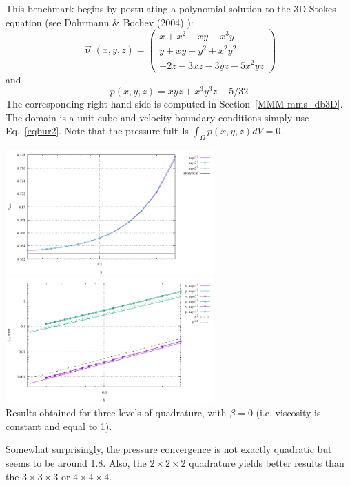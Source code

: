 This benchmark begins by postulating a polynomial solution 
to the 3D Stokes equation (see Dohrmann \& Bochev (2004) \cite{dobo04}):
\begin{equation}
\vec{\upnu}(x,y,z)
=
\left(
\begin{array}{c}
x+x^2+xy+x^3y \\
y + xy + y^2 + x^2 y^2\\
-2z - 3xz - 3yz - 5x^2 yz
\end{array}
\right)
\label{eqbur2}
\end{equation}
and
\begin{equation}
p(x,y,z) = xyz + x^3 y^3z - 5/32
\end{equation}
The corresponding right-hand side is computed in Section~\ref{MMM-mms_db3D}.
The domain is a unit cube and velocity boundary conditions
simply use Eq.~\eqref{eqbur2}.
Note that the pressure fulfills $\int_\Omega p(x,y,z) dV = 0.$

\begin{center}
\includegraphics[width=8cm]{python_codes/fieldstone_82/results/bench1/vrms.pdf}
\includegraphics[width=8cm]{python_codes/fieldstone_82/results/bench1/conv.pdf}\\
{\captionfont Results obtained for three levels of quadrature, with $\beta=0$ (i.e.
viscosity is constant and equal to 1).}
\end{center}

Somewhat surprisingly, the pressure convergence is not exactly quadratic but seems to be
around 1.8. Also, the $2\times 2\times 2$ 
quadrature yields better results than the $3\times 3\times 3$ or $4\times 4 \times 4$.

